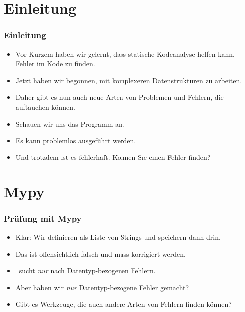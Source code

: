 \documentclass[aspectratio=169,mathserif,notheorems]{beamer}%
\subtitle{18.~Zwischenspiel:~Der Linter Ruff}%
\begin{document}
%
%
\startPresentation%
%
\section{Einleitung}%
\begin{frame}[t]%
\frametitle{Einleitung}%
%
%
%
\begin{itemize}%
%
\item Vor Kurzem haben wir gelernt, dass statische Kodeanalyse helfen kann, Fehler im Kode zu finden.%
%
\item<2-> Jetzt haben wir begonnen, mit komplexeren Datenstrukturen zu arbeiten.%
%
\item<3-> Daher gibt es nun auch neue Arten von Problemen und Fehlern, die auftauchen können.%
%
\item<4-> Schauen wir uns das Programm  an.%
%
\item<5-> Es kann problemlos ausgeführt werden.%
%
\item<6-> Und trotzdem ist es fehlerhaft. Können Sie einen Fehler finden?%
%
\end{itemize}%
%
%
\end{frame}%
%
\section{Mypy}%
%
\begin{frame}[b]%
\frametitle{Prüfung mit Mypy}%
%
%
\begin{itemize}%
%
\item<2-> Klar: Wir definieren  als Liste von Strings und speichern dann  drin.%
\item<3-> Das ist offensichtlich falsch und muss korrigiert werden.%
\item<4-> \mypy\ sucht \emph{nur} nach Datentyp-bezogenen Fehlern.%
\item<5-> Aber haben wir \emph{nur} Datentyp-bezogene Fehler gemacht?%
\item<6-> Gibt es Werkzeuge, die auch andere Arten von Fehlern finden können?%
%
\end{itemize}%
%
%
\end{frame}%
%
\end{document}
